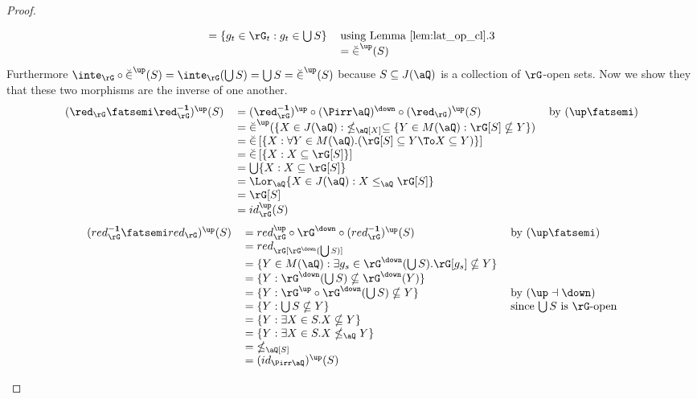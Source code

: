 \documentclass{article}
\begin{document}
\begin{proof}
\begin{enumerate}
\[\begin{tabular}{lll}
$= \{ g_t \in \rG_t : g_t \in \bigcup S  \}$
& using Lemma \ref{lem:lat_op_cl}.3
\\&
$= \breve{\in}^\up(S)$
\end{tabular}
\]
Furthermore $\inte_\rG \circ \breve{\in}^\up(S) = \inte_\rG(\bigcup S) = \bigcup S = \breve{\in}^\up(S)$ because $S \subseteq J(\aQ)$ is a collection of $\rG$-open sets. Now we show they that these two morphisms are the inverse of one another.
\[
\begin{tabular}{lll}
$(\red_\rG \fatsemi \red_\rG^{\bf-1})^\up(S)$
&
$= (\red_\rG^{\bf-1})^\up \circ (\Pirr\aQ)^\down \circ (\red_\rG)^\up(S)$
& by $(\up\fatsemi)$
\\&
$= \breve{\in}^\up(\{ X \in J(\aQ) :\; \nleq_\aQ[X] \subseteq \{ Y \in M(\aQ) : \rG[S] \nsubseteq Y \})$
\\&
$= \breve{\in}\,[\{ X : \forall Y \in M(\aQ).( \rG[S] \subseteq Y \To X \subseteq Y  ) \}]$
\\&
$= \breve{\in}\,[\{ X : X \subseteq \rG[S] \}]$
\\&
$= \bigcup \{ X  : X \subseteq \rG[S] \}$
\\&
$= \Lor_{\aQ} \{ X \in J(\aQ) : X \leq_\aQ \rG[S] \}$
\\&
$= \rG[S]$
\\&
$= id_\rG^\up(S)$
\end{tabular}
\]
\[
\begin{tabular}{lll}
$(red_\rG^{\bf-1} \fatsemi red_\rG)^\up(S)$
&
$= red_\rG^\up \circ \rG^\down \circ (red_\rG^{\bf-1})^\up(S)$
& by $(\up\fatsemi)$
\\&
$= red_\rG[\rG^\down(\bigcup S)]$
\\&
$= \{ Y \in M(\aQ) : \exists g_s \in \rG^\down(\bigcup S). \rG[g_s] \nsubseteq Y \}$
\\&
$= \{ Y  : \rG^\down(\bigcup S) \nsubseteq \rG^\down(Y) \}$
\\&
$= \{ Y  : \rG^\up \circ \rG^\down(\bigcup S) \nsubseteq Y \}$
& by $(\up\dashv\down)$
\\&
$= \{ Y  : \bigcup S \nsubseteq Y \}$
& since $\bigcup S$ is $\rG$-open
\\&
$= \{ Y  : \exists X \in S. X \nsubseteq Y \}$
\\&
$= \{ Y  : \exists X \in S. X \nleq_\aQ Y \}$
\\&
$= \;\nleq_\aQ[S]$
\\&
$= (id_{\Pirr\aQ})^\up(S)$
\end{tabular}
\]


\end{enumerate}
\end{proof}
\end{document}
